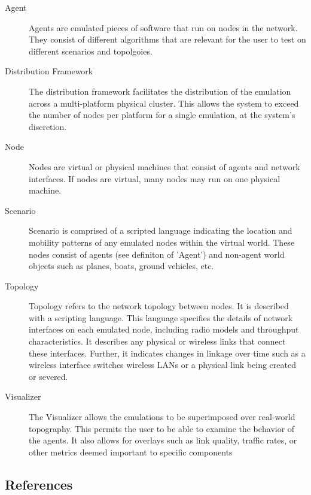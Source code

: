 \documentclass[titlepage]{article}
\begin{document}
\begin{description}
\item[Agent]
	Agents are emulated pieces of software that run on nodes in the network. They consist of different algorithms that are relevant for the user to test on different scenarios and topolgoies.   

\item[Distribution Framework]
	The distribution framework facilitates the distribution of the emulation across a multi-platform physical cluster.  This allows the system to exceed the number of nodes per platform for a single emulation, at the system's discretion.

\item[Node]
	Nodes are virtual or physical machines that consist of agents and network interfaces.  If nodes are virtual, many nodes may run on one physical machine.  

\item[Scenario]
	Scenario is comprised of a scripted language indicating the location and mobility patterns of any emulated nodes within the virtual world. These nodes consist of agents (see definiton of 'Agent') and non-agent world objects such as planes, boats, ground vehicles, etc. 

\item[Topology]
	Topology refers to the network topology between nodes. It is described with a scripting language.  This language specifies the details of network interfaces on each emulated node, including radio models and throughput characteristics.  It describes any physical or wireless links that connect these interfaces.  Further, it indicates changes in linkage over time such as a wireless interface switches wireless LANs or a physical link being created or severed. 

\item[Visualizer]
	The Visualizer allows the emulations to be superimposed over real-world topography.  This permits the user to be able to examine the behavior of the agents.  It also allows for overlays such as link quality, traffic rates, or other metrics deemed important to specific components

\end{description}


\subsection{References%
  \label{references}%
}
\end{document}
